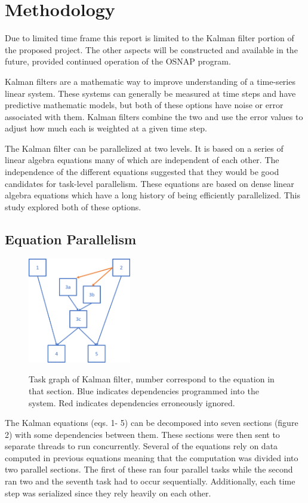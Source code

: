 \section{Methodology} 
Due to limited time frame this report is limited to the Kalman filter portion of the proposed project. The other aspects will be constructed and available in the future, provided continued operation of the OSNAP program.

Kalman filters are a mathematic way to improve understanding of a time-series linear system. These systems can generally be measured at time steps and have predictive mathematic models, but both of these options have noise or error associated  with them. Kalman filters combine the two and use the error values to adjust how much each is weighted at a given time step. 

The Kalman filter can be parallelized at two levels. It is based on a series of linear algebra equations many of which are independent of each other.  The independence of the different equations suggested that they would be good candidates for task-level parallelism. These equations are based on dense linear algebra equations which have a long history of being efficiently parallelized. This study explored both of these options.

\subsection{Equation Parallelism}

\begin{figure}
\includegraphics[width=0.4\textwidth]{dag.png}
\label{fig:dag}
\caption{Task graph of Kalman filter, number correspond to the equation in that section. Blue indicates dependencies programmed into the system. Red indicates dependencies erroneously ignored.}
\end{figure}

The Kalman equations (eqs. 1- 5) can be decomposed into seven sections (figure 2) with some dependencies between them. These sections were then sent to separate threads to run concurrently. Several of the equations rely on data computed in previous equations meaning that the computation was divided into two parallel sections. The first of these ran four parallel tasks while the  second ran two and the seventh task had to occur sequentially. Additionally, each time step was serialized since they rely heavily on each other. 


